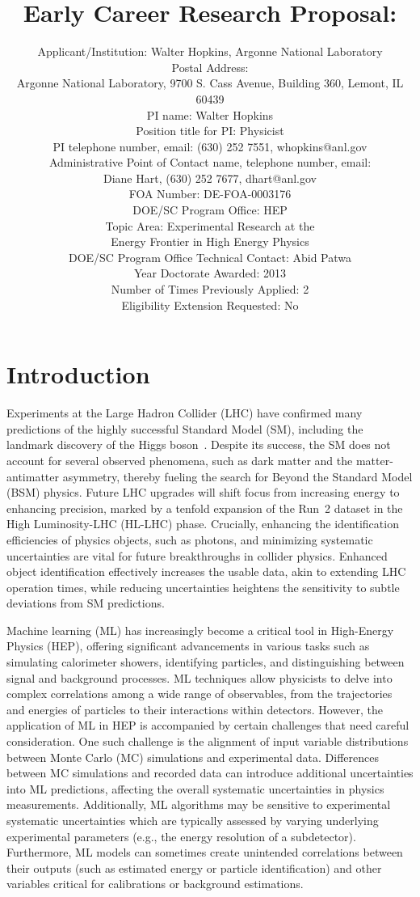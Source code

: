 \documentclass[letter, USenglish, 11pt, subfigure]{article}
\title{Early Career Research Proposal: \\}
\author{Applicant/Institution: Walter Hopkins, Argonne National Laboratory\\ Postal Address: \\Argonne National Laboratory, 9700 S. Cass Avenue, Building 360, Lemont, IL 60439
  \\PI name: Walter Hopkins\\Position title for PI: Physicist\\PI telephone number, email: (630) 252 7551, whopkins@anl.gov\\Administrative Point of Contact name, telephone number, email:\\Diane Hart, (630) 252 7677, dhart@anl.gov\\FOA Number: DE-FOA-0003176\\DOE/SC Program Office: HEP\\ Topic Area: Experimental Research at the \\Energy Frontier in High Energy Physics\\DOE/SC Program Office Technical Contact: Abid Patwa\\Year Doctorate Awarded: 2013\\Number of Times Previously Applied: 2\\Eligibility Extension Requested: No
}
\date{}
\begin{document}
% 

\maketitle
\clearpage
\tableofcontents
\thispagestyle{empty}

\clearpage
{} 
\section{Introduction}

Experiments at the Large Hadron Collider (LHC) have confirmed many predictions of the highly successful Standard Model (SM), including the landmark discovery of the Higgs boson~\cite{HIGG-2012-27,CMS-HIG-12-028}. Despite its success, the SM does not account for several observed phenomena, such as dark matter and the matter-antimatter asymmetry, thereby fueling the search for Beyond the Standard Model (BSM) physics. Future LHC upgrades will shift focus from increasing energy to enhancing precision, marked by a tenfold expansion of the Run~2 dataset in the High Luminosity-LHC (HL-LHC) phase. Crucially, enhancing the identification efficiencies of physics objects, such as photons, and minimizing systematic uncertainties are vital for future breakthroughs in collider physics. Enhanced object identification effectively increases the usable data, akin to extending LHC operation times, while reducing uncertainties heightens the sensitivity to subtle deviations from SM predictions.

Machine learning (ML) has increasingly become a critical tool in High-Energy Physics (HEP), offering significant advancements in various tasks such as simulating calorimeter showers, identifying particles, and distinguishing between signal and background processes. ML techniques allow physicists to delve into complex correlations among a wide range of observables, from the trajectories and energies of particles to their interactions within detectors. However, the application of ML in HEP is accompanied by certain challenges that need careful consideration. One such challenge is the alignment of input variable distributions between Monte Carlo (MC) simulations and experimental data. Differences between MC simulations and recorded data can introduce additional uncertainties into ML predictions, affecting the overall systematic uncertainties in physics measurements. Additionally, ML algorithms may be sensitive to experimental systematic uncertainties which are typically assessed by varying underlying experimental parameters (e.g., the energy resolution of a subdetector). Furthermore, ML models can sometimes create unintended correlations between their outputs (such as estimated energy or particle identification) and other variables critical for calibrations or background estimations.
\end{document}
